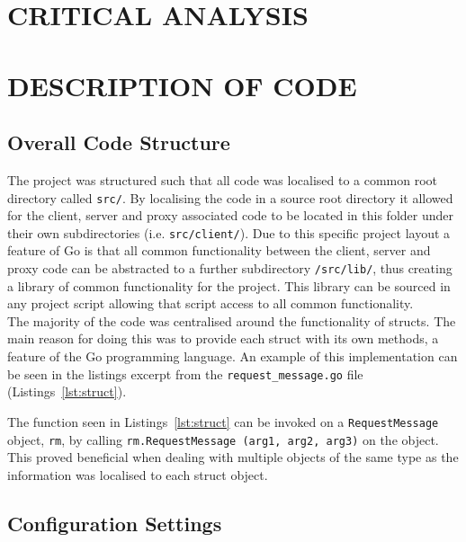 \documentclass[10pt,twocolumn]{witseiepaper}
\begin{document}
\section{CRITICAL ANALYSIS}


\section{DESCRIPTION OF CODE}

	\subsection{Overall Code Structure}

		The project was structured such that all code was localised to a common root directory called \texttt{src/}. By localising the code in a source root directory it allowed for the client, server and proxy associated code to be located in this folder under their own subdirectories (i.e. \texttt{src/client/}). Due to this specific project layout a feature of Go is that all common functionality between the client, server and proxy code can be abstracted to a further subdirectory \texttt{/src/lib/}, thus creating a library of common functionality for the project. This library can be sourced in any project script allowing that script access to all common functionality.\\
		
		The majority of the code was centralised around the functionality of structs. The main reason for doing this was to provide each struct with its own methods, a feature of the Go programming language. An example of this implementation can be seen in the listings excerpt from the \texttt{request\_message.go} file (Listings~\ref{lst:struct}). 
		
		
		
		The function seen in Listings~\ref{lst:struct} can be invoked on a \texttt{RequestMessage} object, \texttt{rm}, by calling \texttt{rm.RequestMessage (arg1, arg2, arg3)} on the object. This proved beneficial when dealing with multiple objects of the same type as the information was localised to each struct object. \\
		
	\subsection{Configuration Settings}
		
\end{document}
